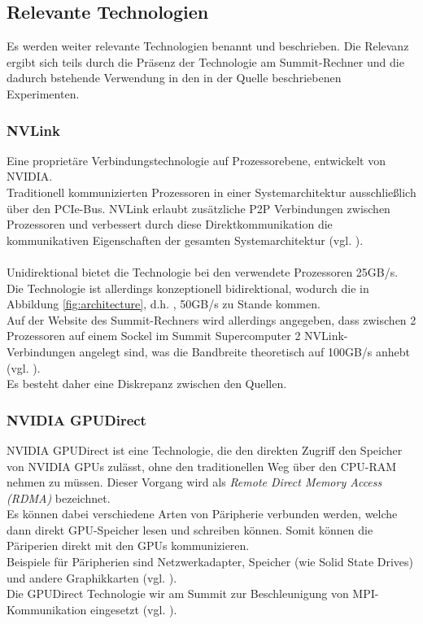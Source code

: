 \subsection{Relevante Technologien}
Es werden weiter relevante Technologien benannt und beschrieben. Die Relevanz ergibt sich teils durch die Präsenz der Technologie am Summit-Rechner und die dadurch bstehende Verwendung in den in der Quelle \cite{mainpaper} beschriebenen Experimenten.

\subsubsection{ NVLink }
Eine proprietäre Verbindungstechnologie auf Prozessorebene, entwickelt von NVIDIA.\\
Traditionell kommunizierten Prozessoren in einer Systemarchitektur ausschließlich über den PCIe-Bus. NVLink erlaubt zusätzliche P2P Verbindungen zwischen Prozessoren und verbessert durch diese Direktkommunikation die kommunikativen Eigenschaften der gesamten Systemarchitektur (vgl. \cite{nvlink}).\\
\\
Unidirektional bietet die Technologie bei den verwendete Prozessoren 25GB/s. Die Technologie ist allerdings konzeptionell bidirektional, wodurch die in Abbildung \ref{fig:architecture}, d.h. \cite[Abb. 1]{mainpaper}, 50GB/s zu Stande kommen.\\
Auf der Website des Summit-Rechners wird allerdings angegeben, dass zwischen 2 Prozessoren auf einem Sockel im Summit Supercomputer 2 NVLink-Verbindungen angelegt sind, was die Bandbreite theoretisch auf 100GB/s anhebt (vgl. \cite[FAQ, What is NVLink?]{osummit}).\\
Es besteht daher eine Diskrepanz zwischen den Quellen.

\subsubsection{ NVIDIA GPUDirect }
NVIDIA GPUDirect ist eine Technologie, die den direkten Zugriff den Speicher von NVIDIA GPUs zulässt, ohne den traditionellen Weg über den CPU-RAM nehmen zu müssen. Dieser Vorgang wird als \textit{Remote Direct Memory Access (RDMA)} bezeichnet.\\
Es können dabei verschiedene Arten von Päripherie verbunden werden, welche dann direkt GPU-Speicher lesen und schreiben können. Somit können die Päriperien direkt mit den GPUs kommunizieren.\\
Beispiele für Päripherien sind Netzwerkadapter, Speicher (wie Solid State Drives) und andere Graphikkarten (vgl. \cite{gpud}).\\
Die GPUDirect Technologie wir am Summit zur Beschleunigung von MPI-Kommunikation eingesetzt (vgl. \cite[Kap. 1]{mainpaper}).

